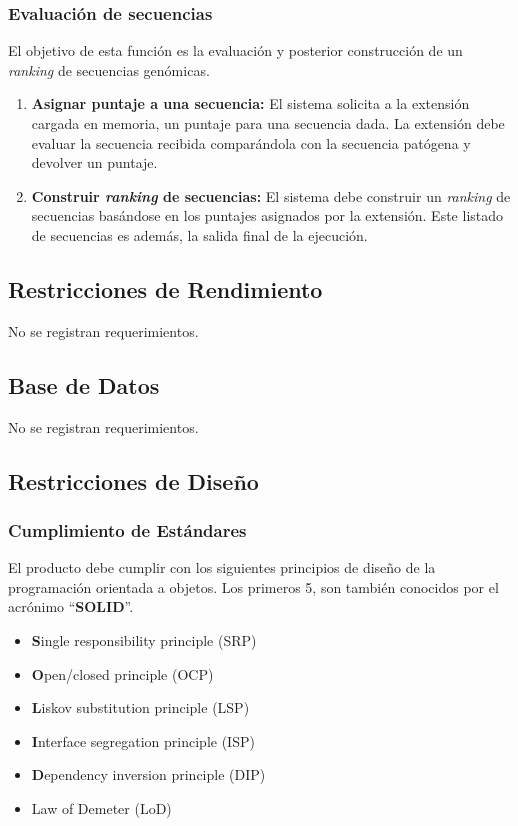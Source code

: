 \documentclass[10pt,a4paper]{article}
\begin{document}
  \subsubsection{Evaluaci\'on de secuencias}
  El objetivo de esta funci\'on es la evaluaci\'on y posterior construcci\'on de
un \textit{ranking} de secuencias gen\'omicas.
  \begin{enumerate}    
    \item \textbf{Asignar puntaje a una secuencia:}
    El sistema solicita a la extensi\'on cargada en memoria, un puntaje para una
secuencia dada. La extensi\'on debe evaluar la secuencia recibida compar\'andola
con la secuencia pat\'ogena y devolver un puntaje.
    
    \item \textbf{Construir \textit{ranking} de secuencias:}
    El sistema debe construir un \textit{ranking} de secuencias bas\'andose en
los puntajes asignados por la extensi\'on. Este listado de secuencias es
adem\'as, la salida final de la ejecuci\'on.
  \end{enumerate}

  \subsection{Restricciones de Rendimiento}
  No se registran requerimientos.

  \subsection{Base de Datos}
  No se registran requerimientos.

  \subsection{Restricciones de Dise\~no}
    \subsubsection{Cumplimiento de Est\'andares}
    El producto debe cumplir con los siguientes principios de dise\~no de la
programaci\'on orientada a objetos. Los primeros 5, son tambi\'en conocidos por
el acr\'onimo ``\textbf{SOLID}''.
    \begin{itemize}
      \item \textbf{S}ingle responsibility principle (SRP)
      \item \textbf{O}pen/closed principle (OCP)
      \item \textbf{L}iskov substitution principle (LSP)
      \item \textbf{I}nterface segregation principle (ISP)
      \item \textbf{D}ependency inversion principle (DIP)   
      \item Law of Demeter (LoD)
    \end{itemize}
\end{document}
